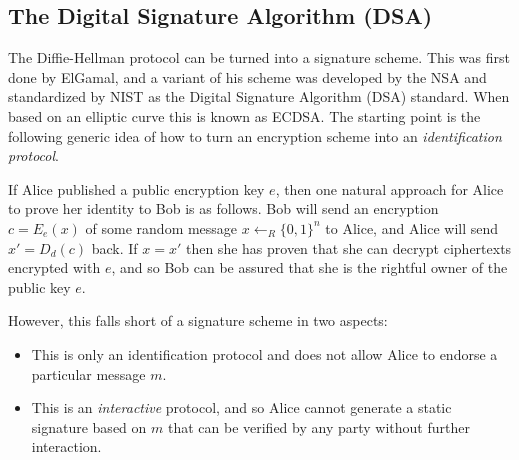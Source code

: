 \hypertarget{strongunforgabilitysigrem}{}

\subsection{The Digital Signature Algorithm
(DSA)}\label{The-Digital-Signature-Alg}

The Diffie-Hellman protocol can be turned into a signature scheme. This
was first done by ElGamal, and a variant of his scheme was developed by
the NSA and standardized by NIST as the Digital Signature Algorithm
(DSA) standard. When based on an elliptic curve this is known as ECDSA.
The starting point is the following generic idea of how to turn an
encryption scheme into an \emph{identification protocol}.

If Alice published a public encryption key \(e\), then one natural
approach for Alice to prove her identity to Bob is as follows. Bob will
send an encryption \(c=E_e(x)\) of some random message
\(x \leftarrow_R \{0,1\}^n\) to Alice, and Alice will send \(x'=D_d(c)\)
back. If \(x=x'\) then she has proven that she can decrypt ciphertexts
encrypted with \(e\), and so Bob can be assured that she is the rightful
owner of the public key \(e\).

However, this falls short of a signature scheme in two aspects:

\begin{itemize}
\tightlist
\item
  This is only an identification protocol and does not allow Alice to
  endorse a particular message \(m\).\\
\item
  This is an \emph{interactive} protocol, and so Alice cannot generate a
  static signature based on \(m\) that can be verified by any party
  without further interaction.
\end{itemize}

